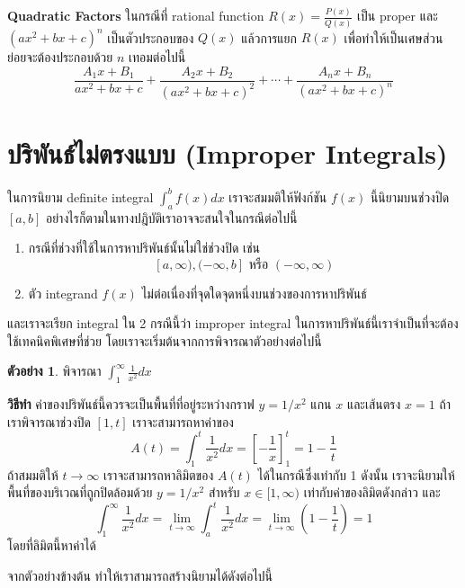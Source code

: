\documentclass[
]{book}
\theoremstyle{definition}
\theoremstyle{definition}
\newtheorem{example}{ตัวอย่าง}[chapter]
\theoremstyle{definition}
\theoremstyle{definition}
\theoremstyle{remark}
\begin{document}
\textbf{Quadratic Factors} ในกรณีที่ rational function
\(R(x) = \frac{P(x)}{Q(x)}\) เป็น proper และ \((ax^2 +bx+c)^n\)
เป็นตัวประกอบของ \(Q(x)\) แล้วการแยก \(R(x)\) เพื่อทำให้เป็นเศษส่วนย่อยจะต้องประกอบด้วย
\(n\) เทอมต่อไปนี้
\[\frac{A_1x + B_1}{ax^2+bx+c} +  \frac{A_2x + B_2}{({ax^2+bx+c})^2} + \cdots +  \frac{A_nx + B_n}{({ax^2+bx+c})^n}\]

\section{ปริพันธ์ไม่ตรงแบบ (Improper Integrals)}\label{uxe1buxe23uxe1euxe19uxe18uxe44uxe21uxe15uxe23uxe07uxe41uxe1auxe1a-improper-integrals}

ในการนิยาม definite integral \(\int_{a}^{b} f(x) dx\) เราจะสมมติให้ฟังก์ชัน
\(f(x)\) นี้นิยามบนช่วงปิด \([a,b]\) อย่างไรก็ตามในทางปฎิบัติเราอาจจะสนใจในกรณีต่อไปนี้

\begin{enumerate}
\def\labelenumi{\arabic{enumi}.}
\item
  กรณีที่ช่วงที่ใช้ในการหาปริพันธ์นั้นไม่ใช่ช่วงปิด เช่น
  \[[a, \infty) , (-\infty,b] \text{ หรือ } (-\infty,\infty)\]
\item
  ตัว integrand \(f(x)\) ไม่ต่อเนื่องที่จุดใดจุดหนึ่งบนช่วงของการหาปริพันธ์
\end{enumerate}

และเราจะเรียก integral ใน 2 กรณีนี้ว่า improper integral
ในการหาปริพันธ์นี้เราจำเป็นที่จะต้องใช้เทคนิคพิเศษที่ช่วย
โดยเราจะเริ่มต้นจากการพิจารณาตัวอย่างต่อไปนี้

\begin{example}
พิจารณา \(\int_{1}^{\infty} \frac{1}{x^2} dx\)
\end{example}

\textbf{วิธีทำ} ค่าของปริพันธ์นี้ควรจะเป็นพื้นที่ที่อยู่ระหว่างกราฟ \(y =  1/x^2\) แกน \(x\)
และเส้นตรง \(x=1\) ถ้าเราพิจารณาช่วงปิด \([1,t]\) เราจะสามารถหาค่าของ
\[A(t) = \int_{1}^{t} \frac{1}{x^2} dx =  \left[-\frac{1}{x}\right]_{1}^{t} = 1 - \frac{1}{t}\]
ถ้าสมมติให้ \(t \rightarrow \infty\) เราจะสามารถหาลิมิตของ \(A(t)\)
ได้ในกรณีซึ่งเท่ากับ 1 ดังนั้น เราจะนิยามให้พื้นที่ของบริเวณที่ถูกปิดล้อมด้วย \(y =  1/x^2\)
สำหรับ \(x \in [1,\infty)\) เท่ากับค่าของลิมิตดังกล่าว และ
\[\int_{1}^{\infty} \frac{1}{x^2} dx = \lim_{t \rightarrow \infty} \int_{a}^t \frac{1}{x^2}dx = 
    \lim_{t \rightarrow \infty} (1 - \frac{1}{t}) = 1\] โดยที่ลิมิตนี้หาค่าได้

จากตัวอย่างข้างต้น ทำให้เราสามารถสร้างนิยามได้ดังต่อไปนี้
\end{document}
